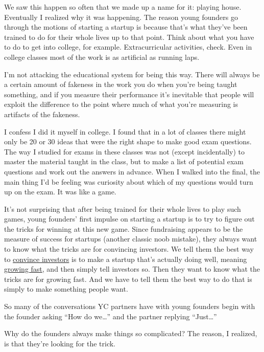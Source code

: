 We saw this happen so often that we made up a name for it: playing
house. Eventually I realized why it was happening. The reason young
founders go through the motions of starting a startup is because that's
what they've been trained to do for their whole lives up to that point.
Think about what you have to do to get into college, for example.
Extracurricular activities, check. Even in college classes most of the
work is as artificial as running laps.

I'm not attacking the educational system for being this way. There will
always be a certain amount of fakeness in the work you do when you're
being taught something, and if you measure their performance it's
inevitable that people will exploit the difference to the point where
much of what you're measuring is artifacts of the fakeness.

I confess I did it myself in college. I found that in a lot of classes
there might only be 20 or 30 ideas that were the right shape to make
good exam questions. The way I studied for exams in these classes was
not (except incidentally) to master the material taught in the class,
but to make a list of potential exam questions and work out the answers
in advance. When I walked into the final, the main thing I'd be feeling
was curiosity about which of my questions would turn up on the exam. It
was like a game.

It's not surprising that after being trained for their whole lives to
play such games, young founders' first impulse on starting a startup is
to try to figure out the tricks for winning at this new game. Since
fundraising appears to be the measure of success for startups (another
classic noob mistake), they always want to know what the tricks are for
convincing investors. We tell them the best way to
\href{convince.html}{convince investors} is to make a startup that's
actually doing well, meaning \href{growth.html}{growing fast}, and then
simply tell investors so. Then they want to know what the tricks are for
growing fast. And we have to tell them the best way to do that is simply
to make something people want.

So many of the conversations YC partners have with young founders begin
with the founder asking ``How do we\ldots{}'' and the partner replying
``Just\ldots{}''

Why do the founders always make things so complicated? The reason, I
realized, is that they're looking for the trick.

